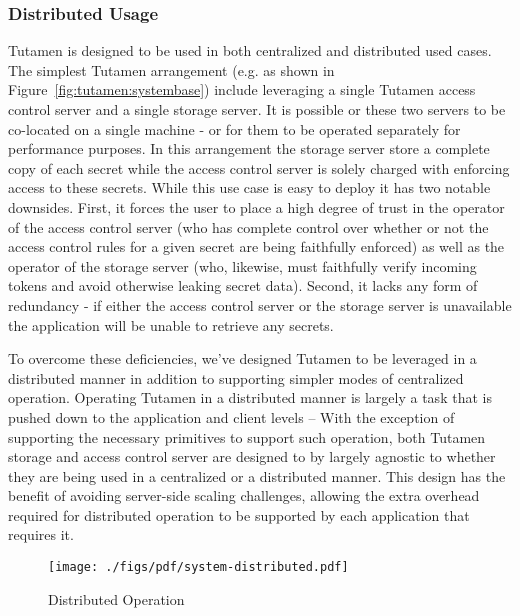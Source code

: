 \subsubsection{Distributed Usage}

Tutamen is designed to be used in both centralized and distributed
used cases. The simplest Tutamen arrangement (e.g. as shown in
Figure~\ref{fig:tutamen:systembase}) include leveraging a single
Tutamen access control server and a single storage server. It is
possible or these two servers to be co-located on a single machine -
or for them to be operated separately for performance purposes. In
this arrangement the storage server store a complete copy of each
secret while the access control server is solely charged with
enforcing access to these secrets. While this use case is easy to
deploy it has two notable downsides. First, it forces the user to
place a high degree of trust in the operator of the access control
server (who has complete control over whether or not the access
control rules for a given secret are being faithfully enforced) as
well as the operator of the storage server (who, likewise, must
faithfully verify incoming tokens and avoid otherwise leaking secret
data). Second, it lacks any form of redundancy - if either the access
control server or the storage server is unavailable the application
will be unable to retrieve any secrets.

To overcome these deficiencies, we've designed Tutamen to be leveraged
in a distributed manner in addition to supporting simpler modes of
centralized operation. Operating Tutamen in a distributed manner is
largely a task that is pushed down to the application and client
levels -- With the exception of supporting the necessary primitives to
support such operation, both Tutamen storage and access control server
are designed to by largely agnostic to whether they are being used in
a centralized or a distributed manner. This design has the benefit of
avoiding server-side scaling challenges, allowing the extra overhead
required for distributed operation to be supported by each application
that requires it.

\begin{figure}[th]
  \centering
  \texttt{[image: ./figs/pdf/system-distributed.pdf]}
  \caption{Distributed Operation}
  \label{fig:tutamen:systemdistributed}
\end{figure}

